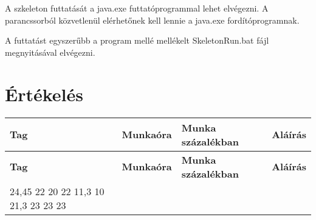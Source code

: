 

A szkeleton futtatását a java.exe futtatóprogrammal lehet elvégezni. A parancssorból közvetlenül elérhetőnek kell lennie a java.exe fordítóprogramnak. 

A futtatást egyszerűbb a program mellé mellékelt SkeletonRun.bat fájl megnyitásával elvégezni.

\section{Értékelés}
\newenvironment{ertekelesplusz}
{
	\begin{center}
	\begin{longtable}{| p{3cm} | r | r | p{6cm} |}
	\hline
	\multicolumn{1}{|p{3cm}|}{\textbf{Tag}} &
	\multicolumn{1}{l|}{\textbf{Munkaóra}}&
	\multicolumn{1}{l|}{\textbf{Munka százalékban}} &
	\multicolumn{1}{r|}{\textbf{Aláírás}} \tabularnewline \hline \hline 
	\endfirsthead

	\hline
	\multicolumn{1}{|p{3cm}|}{\textbf{Tag}} &
	\multicolumn{1}{l|}{\textbf{Munkaóra}}&
	\multicolumn{1}{l|}{\textbf{Munka százalékban}} &
	\multicolumn{1}{r|}{\textbf{Aláírás}} \tabularnewline \hline \hline 
	\endhead

}
{
	\end{longtable}
	\end{center}
}

\begin{ertekelesplusz}
\tag{Elekes} %
{24,45} %
{22}        %
\tag{Fuksz}
{20}
{22}
\tag{Nagy}
{11,3}
{10}
\tag{Rédes}
{21,3}
{23}
\tag{Seres}
{23}
{23}

\end{ertekelesplusz}

